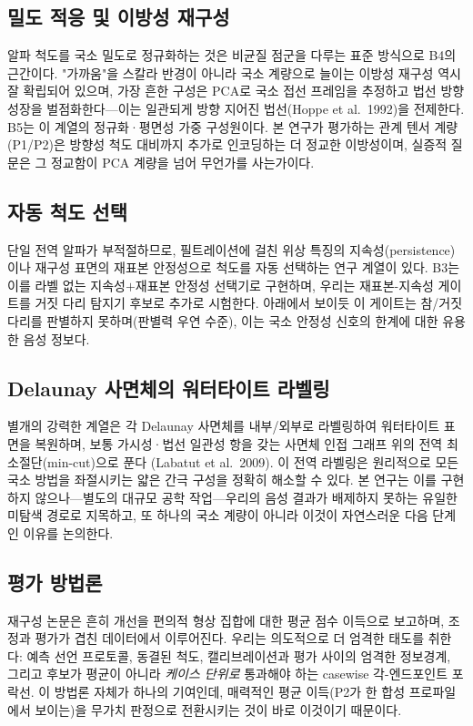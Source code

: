 \documentclass[11pt]{article}
\begin{document}
\subsection{밀도 적응 및 이방성 재구성}
알파 척도를 국소 밀도로 정규화하는 것은 비균질 점군을 다루는 표준 방식으로 B4의 근간이다.
"가까움"을 스칼라 반경이 아니라 국소 계량으로 늘이는 이방성 재구성 역시 잘 확립되어 있으며,
가장 흔한 구성은 PCA로 국소 접선 프레임을 추정하고 법선 방향 성장을 벌점화한다---이는 일관되게
방향 지어진 법선(Hoppe et al.\ 1992)을 전제한다. B5는 이 계열의 정규화·평면성 가중 구성원이다.
본 연구가 평가하는 관계 텐서 계량(P1/P2)은 방향성 척도 대비까지 추가로 인코딩하는 더 정교한
이방성이며, 실증적 질문은 그 정교함이 PCA 계량을 넘어 무언가를 사는가이다.

\subsection{자동 척도 선택}
단일 전역 알파가 부적절하므로, 필트레이션에 걸친 위상 특징의 지속성(persistence)이나 재구성
표면의 재표본 안정성으로 척도를 자동 선택하는 연구 계열이 있다. B3는 이를 라벨 없는
지속성$+$재표본 안정성 선택기로 구현하며, 우리는 재표본-지속성 게이트를 거짓 다리 탐지기 후보로
추가로 시험한다. 아래에서 보이듯 이 게이트는 참/거짓 다리를 판별하지 못하며(판별력 우연 수준),
이는 국소 안정성 신호의 한계에 대한 유용한 음성 정보다.

\subsection{Delaunay 사면체의 워터타이트 라벨링}
별개의 강력한 계열은 각 Delaunay 사면체를 내부/외부로 라벨링하여 워터타이트 표면을 복원하며,
보통 가시성·법선 일관성 항을 갖는 사면체 인접 그래프 위의 전역 최소절단(min-cut)으로 푼다
(Labatut et al.\ 2009). 이 전역 라벨링은 원리적으로 모든 국소 방법을 좌절시키는 얇은 간극
구성을 정확히 해소할 수 있다. 본 연구는 이를 구현하지 않으나---별도의 대규모 공학 작업---우리의
음성 결과가 배제하지 못하는 유일한 미탐색 경로로 지목하고, 또 하나의 국소 계량이 아니라 이것이
자연스러운 다음 단계인 이유를 논의한다.

\subsection{평가 방법론}
재구성 논문은 흔히 개선을 편의적 형상 집합에 대한 평균 점수 이득으로 보고하며, 조정과 평가가
겹친 데이터에서 이루어진다. 우리는 의도적으로 더 엄격한 태도를 취한다: 예측 선언 프로토콜,
동결된 척도, 캘리브레이션과 평가 사이의 엄격한 정보경계, 그리고 후보가 평균이 아니라 \emph{케이스
단위로} 통과해야 하는 casewise 각-엔드포인트 포락선. 이 방법론 자체가 하나의 기여인데, 매력적인
평균 이득(P2가 한 합성 프로파일에서 보이는)을 무가치 판정으로 전환시키는 것이 바로 이것이기
때문이다.
\end{document}
